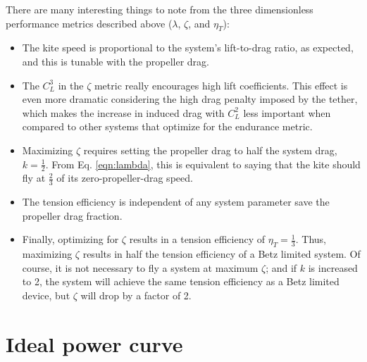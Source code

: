 \documentclass[11pt]{amsart}
\begin{document}
There are many interesting things to note from the three dimensionless
performance metrics described above ($\lambda$, $\zeta$, and $\eta_T$):
\begin{itemize}
\item The kite speed is proportional to the system's
  lift-to-drag ratio, as expected, and this is tunable with the
  propeller drag.

\item The $C_L^3$ in the $\zeta$ metric really encourages high lift
  coefficients.  This effect is even more dramatic considering the
  high drag penalty imposed by the tether, which makes the increase in
  induced drag with $C_L^2$ less important when compared to other
  systems that optimize for the endurance metric.

\item Maximizing $\zeta$ requires setting the propeller drag to half
  the system drag, $k = \frac{1}{2}$.  From Eq. \ref{eqn:lambda}, this
  is equivalent to saying that the kite should fly at $\frac{2}{3}$ of
  its zero-propeller-drag speed.

\item The tension efficiency is independent of any system parameter
  save the propeller drag fraction.

\item Finally, optimizing for $\zeta$ results in a tension efficiency
  of $\eta_T = \frac{1}{3}$.  Thus, maximizing $\zeta$ results in half
  the tension efficiency of a Betz limited system.  Of course, it is
  not necessary to fly a system at maximum $\zeta$; and if $k$ is
  increased to 2, the system will achieve the same tension efficiency
  as a Betz limited device, but $\zeta$ will drop by a factor of 2.
\end{itemize}


\section{Ideal power curve}
\end{document}
